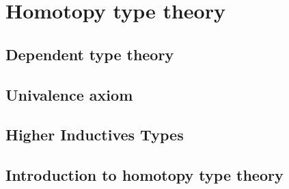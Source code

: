 \chapter{Homotopy type theory}
\label{chap:hott}

\section{Dependent type theory}
\label{sec:mltt}

\section{Univalence axiom}
\label{sec:ua}

\section{Higher Inductives Types}
\label{sec:hit}

\section{Introduction to homotopy type theory}
\label{sec:hott}


